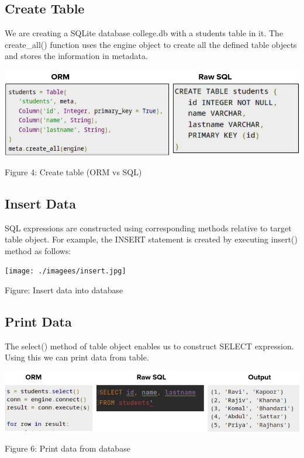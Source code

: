 \documentclass[10pt,a4paper,twoside]{article}
\begin{document}
\subsection{Create Table}
We are creating a SQLite database college.db with a students table in it. The create\_all() function uses the engine object to create all the defined table objects and stores the information in metadata.
\item
\begin{figure4}
  \includegraphics[width=\linewidth]{./images/create_table.jpg}
  \caption{Figure 4: Create table (ORM vs SQL)}
  \label{fig:Create table(ORM vs SQL)}
\end{figure4}

\subsection{Insert Data}
SQL expressions are constructed using corresponding methods relative to target table object. For example, the INSERT statement is created by executing insert() method as follows:
\item
\begin{figure5}
  \texttt{[image: ./imagees/insert.jpg]}
  \caption{Figure: Insert data into database}
  \label{fig:Insert data into database (ORM vs SQL)}
\end{figure5}

\subsection{Print Data}
The select() method of table object enables us to construct SELECT expression. Using this we can print data from table.
\item
\begin{figure6}
  \includegraphics[width=\linewidth]{./images/select.jpg}
  \caption{Figure 6: Print data from database}
  \label{fig:Print data from database }
\end{figure6}
\end{document}
